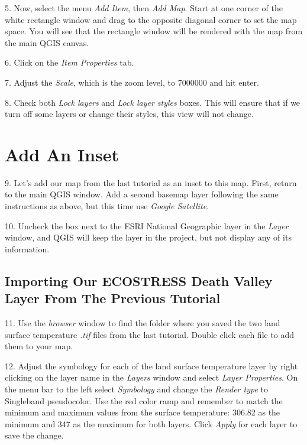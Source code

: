 \documentclass[oneside,a4paper,11pt,explicit]{book}
\begin{document}
5. Now, select the menu \textit{Add Item}, then \textit{Add Map}. Start at one corner of the white rectangle window and drag to the opposite diagonal corner to set the map space. You will see that the rectangle window will be rendered with the map from the main QGIS canvas.

6. Click on the \textit{Item Properties} tab.

7. Adjust the \textit{Scale}, which is the zoom level, to 7000000 and hit enter.

8. Check both \textit{Lock layers} and \textit{Lock layer styles} boxes. This will ensure that if we turn off some layers or change their styles, this view will not change.


\section{Add An Inset}

9. Let's add our map from the last tutorial as an inset to this map. First, return to the main QGIS window. Add a second basemap layer following the same instructions as above, but this time use \textit{Google Satellite}.

10. Uncheck the box next to the ESRI National Geographic layer in the \emph{Layer} window, and QGIS will keep the layer in the project, but not display any of its information.

\subsection{Importing Our ECOSTRESS Death Valley Layer From The Previous Tutorial}
11. Use the \textit{browser} window to find the folder where you saved the two land surface temperature \textit{.tif} files from the last tutorial. Double click each file to add them to your map.

12. Adjust the symbology for each of the land surface temperature layer by right clicking on the layer name in the \textit{Layers} window and select \textit{Layer Properties}. On the menu bar to the left select \textit{Symbology} and change the \textit{Render type} to Singleband pseudocolor. Use the red color ramp and remember to match the minimum and maximum values from the surface temperature: 306.82 as the minimum and 347 as the maximum for both layers. Click \textit{Apply} for each layer to save the change.
\end{document}
